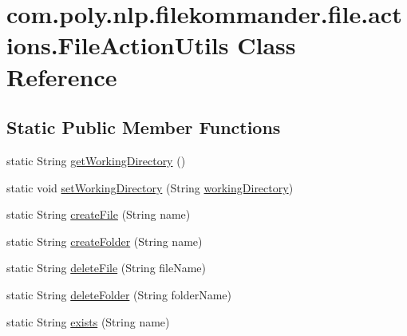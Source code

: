 \hypertarget{classcom_1_1poly_1_1nlp_1_1filekommander_1_1file_1_1actions_1_1_file_action_utils}{\section{com.\-poly.\-nlp.\-filekommander.\-file.\-actions.\-File\-Action\-Utils Class Reference}
\label{classcom_1_1poly_1_1nlp_1_1filekommander_1_1file_1_1actions_1_1_file_action_utils}
}
\subsection*{Static Public Member Functions}
\begin{DoxyCompactItemize}
\item 
static String \hyperlink{classcom_1_1poly_1_1nlp_1_1filekommander_1_1file_1_1actions_1_1_file_action_utils_a322374face7f551b379f23ddb6a235b9}{get\-Working\-Directory} ()
\item 
static void \hyperlink{classcom_1_1poly_1_1nlp_1_1filekommander_1_1file_1_1actions_1_1_file_action_utils_ae355d7d7cf883ff39ffe96a1bde89576}{set\-Working\-Directory} (String \hyperlink{classcom_1_1poly_1_1nlp_1_1filekommander_1_1file_1_1actions_1_1_file_action_utils_ad54a8fdc9145d2f423c54cb1597f874a}{working\-Directory})
\item 
static String \hyperlink{classcom_1_1poly_1_1nlp_1_1filekommander_1_1file_1_1actions_1_1_file_action_utils_aac7f019247f469c1ea84e1a9e158e161}{create\-File} (String name)
\item 
static String \hyperlink{classcom_1_1poly_1_1nlp_1_1filekommander_1_1file_1_1actions_1_1_file_action_utils_a8cba8b4dc29efed981108c8cbd09e40b}{create\-Folder} (String name)
\item 
static String \hyperlink{classcom_1_1poly_1_1nlp_1_1filekommander_1_1file_1_1actions_1_1_file_action_utils_ac256836b0ce9fbf8c92a6315328e641f}{delete\-File} (String file\-Name)
\item 
static String \hyperlink{classcom_1_1poly_1_1nlp_1_1filekommander_1_1file_1_1actions_1_1_file_action_utils_a061f74de68076705a673624a99d993c6}{delete\-Folder} (String folder\-Name)
\item 
static String \hyperlink{classcom_1_1poly_1_1nlp_1_1filekommander_1_1file_1_1actions_1_1_file_action_utils_af2aa2e6f0a35f71130a23a1ad9d3e206}{exists} (String name)
\item 

\end{DoxyCompactItemize}

